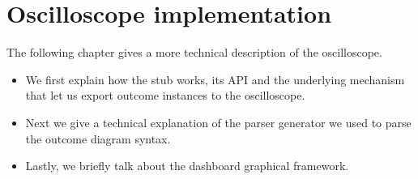 \chapter{Oscilloscope implementation}
    The following chapter gives a more technical description of the oscilloscope.
    \begin{itemize}
        \item We first explain how the stub works, its API and the underlying mechanism that let us export outcome instances to the oscilloscope.
        \item Next we give a technical explanation of the parser generator we used to parse the outcome diagram syntax.
        \item Lastly, we briefly talk about the dashboard graphical framework.
    \end{itemize}

    
    
    
    
